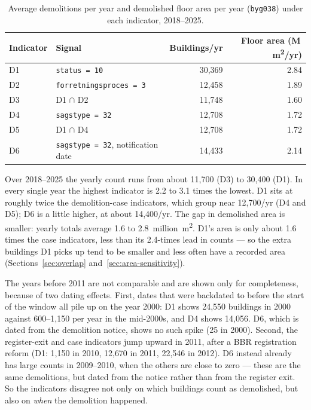 \begin{table}[htbp]
\centering
\caption{Average demolitions per year and demolished floor area per year
(\texttt{byg038}) under each indicator, 2018--2025.}
\label{tab:annual-mean}
\begin{tabular}{llrr}
\toprule
Indicator & Signal & Buildings/yr & Floor area (M\,m\textsuperscript{2}/yr) \\
\midrule
D1 & \texttt{status = 10}              & 30{,}369 & 2.84 \\
D2 & \texttt{forretningsproces = 3}    & 12{,}458 & 1.89 \\
D3 & D1 $\cap$ D2                      & 11{,}748 & 1.60 \\
D4 & \texttt{sagstype = 32}            & 12{,}708 & 1.72 \\
D5 & D1 $\cap$ D4                      & 12{,}708 & 1.72 \\
D6 & \texttt{sagstype = 32}, notification date & 14{,}433 & 2.14 \\
\bottomrule
\end{tabular}
\end{table}

Over 2018--2025 the yearly count runs from about 11{,}700 (D3) to
30{,}400 (D1). In every single year the highest indicator is 2.2 to 3.1
times the lowest. D1 sits at roughly twice the demolition-case indicators,
which group near 12{,}700/yr (D4 and D5); D6 is a little higher, at
about 14{,}400/yr. The gap in demolished area is smaller: yearly totals
average 1.6 to 2.8~million~m\textsuperscript{2}. D1's area is only about
1.6 times the case indicators, less than its 2.4-times lead in counts --- so
the extra buildings D1 picks up tend to be smaller and less often have a
recorded area (Sections~\ref{sec:overlap} and~\ref{sec:area-sensitivity}).

The years before 2011 are not comparable and are shown only for
completeness, because of two dating effects. First, dates that were
backdated to before the start of the window all pile up on the year 2000:
D1 shows 24{,}550 buildings in 2000 against 600--1{,}150 per year in the
mid-2000s, and D4 shows 14{,}056. D6, which is dated from the demolition
notice, shows no such spike (25 in 2000). Second, the register-exit and
case indicators jump upward in 2011, after a BBR registration reform (D1:
1{,}150 in 2010, 12{,}670 in 2011, 22{,}546 in 2012). D6 instead already
has large counts in 2009--2010, when the others are close to zero --- these
are the same demolitions, but dated from the notice rather than from the
register exit. So the indicators disagree not only on which buildings count
as demolished, but also on \emph{when} the demolition happened.

